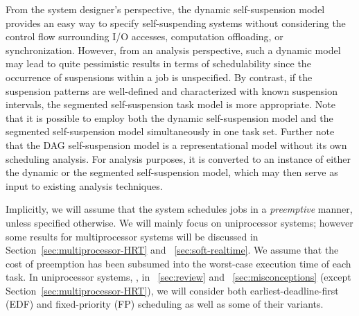 From the system designer's perspective, the dynamic self-suspension model provides an easy way to specify self-suspending systems 
without considering the control flow surrounding I/O accesses, computation offloading, or synchronization. However, from an analysis perspective, such a 
dynamic model may lead to quite pessimistic results in terms of schedulability since the occurrence of suspensions within a job is 
unspecified. By contrast, if the suspension patterns are well-defined and characterized with known suspension intervals, the 
segmented self-suspension task model is more appropriate.   
Note that it is possible to employ both the dynamic self-suspension model and the segmented self-suspension model simultaneously 
in one task set.
Further note that the DAG self-suspension model is a representational model without its own scheduling analysis. For analysis purposes, it is converted to an instance of either the dynamic or the segmented self-suspension model, which may then serve as input to existing analysis techniques. 


  








Implicitly, we will assume that the system schedules  jobs in a
\emph{preemptive} manner, unless specified otherwise.  We will mainly focus on
uniprocessor systems; however some results for multiprocessor systems
will be discussed in Section~\ref{sec:multiprocessor-HRT} and
\mysectionref{}~\ref{sec:soft-realtime}. 
We assume that the cost of preemption
has been subsumed into the worst-case execution time of each task. In
uniprocessor systems, \ie, in \mysectionref{}~\ref{sec:review} and
\mysectionref{}~\ref{sec:misconceptions} (except Section~\ref{sec:multiprocessor-HRT}), we will consider both
earliest-deadline-first (EDF) and 
fixed-priority (FP)
scheduling as well as some of their variants. 

